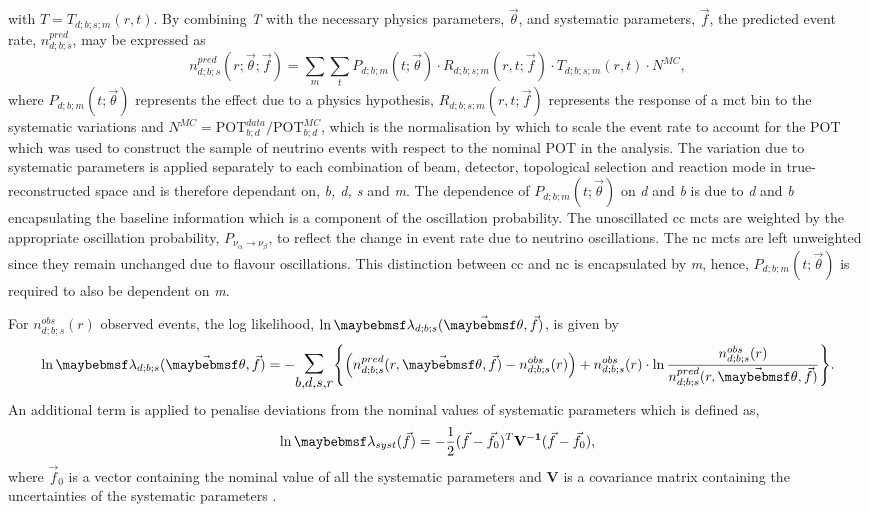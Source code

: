 with $T = T_{d;b;s;m}(r, t)$. By combining \textit{T} with the necessary physics parameters, $\vec{\theta}$, and systematic parameters, $\vec{f}$, the predicted event rate, $n^{pred}_{d;b;s}$, may be expressed as
\begin{equation}
n_{d;b;s}^{pred}(r; \vec{\theta}; \vec{f}) =
   \sum_{m} \sum_{t}  P_{d;b;m}(t; \vec{\theta}) \cdot R_{d;b;s;m}(r,t; \vec{f}) \cdot T_{d;b;s;m}(r,t) \cdot N^{MC},
   \label{eq:valor_npred}
\end{equation}
where $P_{d;b;m}(t; \vec{\theta})$ represents the effect due to a physics hypothesis, $R_{d;b;s;m}(r,t; \vec{f})$ represents the response of a \gls{mct} bin to the systematic variations and $N^{MC} = \mbox{POT}_{b;d}^{data}/\mbox{POT}_{b;d}^{MC}$, which is the normalisation by which to scale the event rate to account for the POT which was used to construct the sample of neutrino events with respect to the nominal POT in the analysis. The variation due to systematic parameters is applied separately to each combination of beam, detector, topological selection and reaction mode in true-reconstructed space and is therefore dependant on, \textit{b, d, s} and \textit{m}. The dependence of $P_{d;b;m}(t; \vec{\theta})$ on \textit{d} and \textit{b} is due to \textit{d} and \textit{b} encapsulating the baseline information which is a component of the oscillation probability. The unoscillated \gls{cc} \glspl{mct} are weighted by the appropriate oscillation probability, $P_{\nu_{\alpha} \rightarrow \nu_{\beta}}$, to reflect the change in event rate due to neutrino oscillations. The \gls{nc} \glspl{mct} are left unweighted since they remain unchanged due to flavour oscillations. This distinction between \gls{cc} and \gls{nc} is encapsulated by \textit{m}, hence, $P_{d;b;m}(t; \vec{\theta})$ is required to also be dependent on \textit{m}. 

For $n_{d ; b ; s}^{obs}(r)$ observed events, the log likelihood, $\lnOf{\lambda_{d;b;s}(\vec \theta, \vec f)}$, is given by
\begin{equation}
    \lnOf{\lambda_{d;b;s}(\vec \theta, \vec f)} = - \mathlarger{\mathlarger{\sum_{b,d,s,r}}} \Bigg \{ \Big (n_{d;b;s}^{pred}(r,\vec{\theta},\vec{f})
    - n_{d ; b ; s}^{obs}(r) \Big) + n_{d ; b ; s}^{obs}(r) \cdot \lnOf{\frac{n_{d ; b ; s}^{obs}(r)}{n_{d ; b ; s}^{p r e d}(r , \vec{\theta} , \vec{f})}} \Bigg \}.
\end{equation}
An additional term is applied to penalise deviations from the nominal values of systematic parameters which is defined as,
\begin{equation}
    \lnOf{\lambda_{syst}(\vec{f})} = -\frac{1}{2} (\vec{f} - \vec{f}_0)^T \mathbf{V^{-1}} (\vec{f} - \vec{f}_0),
\end{equation}
where $\vec{f}_0$ is a vector containing the nominal value of all the systematic parameters and \textbf{V} is a covariance matrix containing the uncertainties of the systematic parameters \cite{VALOR_dune}. 

